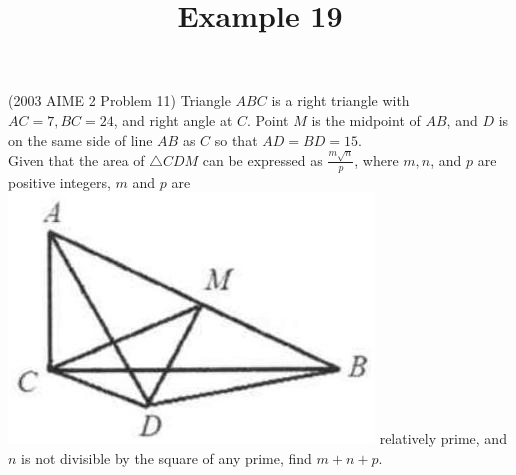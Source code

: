 \documentclass{article}
\title{Example 19}
\date{}
\begin{document}
\maketitle

(2003 AIME 2 Problem 11) Triangle \(A B C\) is a right triangle with \(A C=7, B C=24\), and right angle at \(C\). Point \(M\) is the midpoint of \(A B\), and \(D\) is on the same side of line \(A B\) as \(C\) so that \(A D=B D=15\).\\
Given that the area of \(\triangle C D M\) can be expressed as \(\frac{m \sqrt{n}}{p}\), where \(m, n\), and \(p\) are positive integers, \(m\) and \(p\) are\\
\includegraphics[width=\textwidth]{images/086.jpg} relatively prime, and \(n\) is not divisible by the square of any prime, find \(m+n+p\).
\end{document}
